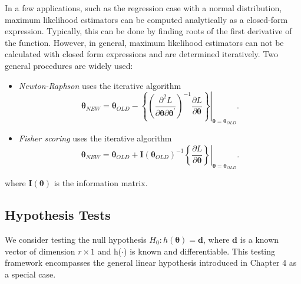 In a few applications, such as the regression case with a normal
distribution, maximum likelihood estimators can be computed
analytically as a closed-form expression. Typically, this can be
done by finding roots of the first derivative of the function.
However, in general, maximum likelihood estimators can not be
calculated with closed form expressions and are determined
iteratively. Two general procedures are widely used:
\begin{itemize}
  \item \emph{Newton-Raphson} uses the iterative algorithm
  \begin{equation}
\boldsymbol \theta_{NEW} = \boldsymbol \theta_{OLD} - \left. \left\{
\left( \frac{ \partial^2 L}{\partial \boldsymbol \theta
\partial \boldsymbol \theta^{\prime}} \right)^{-1}
\frac{\partial L}{\partial \boldsymbol \theta } \right\} \right|_
{\boldsymbol \theta = \boldsymbol \theta_{OLD}} .
  \end{equation}
  \item \emph{Fisher scoring} uses the iterative algorithm
    \begin{equation}
\boldsymbol \theta_{NEW} = \boldsymbol \theta_{OLD} +
\mathbf{I}(\boldsymbol \theta_{OLD})^{-1} \left. \left\{
\frac{\partial L}{\partial \boldsymbol \theta } \right\} \right|_
{\boldsymbol \theta = \boldsymbol \theta_{OLD}} .
  \end{equation}
\end{itemize}
where $\mathbf{I}(\boldsymbol \theta)$ is the information matrix.



\subsection{Hypothesis Tests}\label{S11:HypTests}

We consider testing the null hypothesis $H_0: h(\boldsymbol \theta)
= \mathbf{d}$, where $\mathbf{d}$ is a known vector of dimension $r
\times 1$ and h($\cdot$) is known and differentiable. This testing
framework encompasses the general linear hypothesis introduced in
Chapter 4 as a special case.

